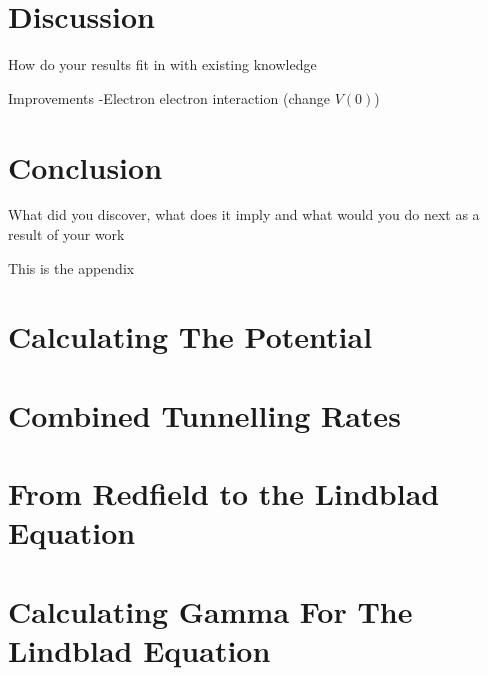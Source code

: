 \documentclass{article}
\begin{document}
\section{Discussion}
How do your results fit in with existing knowledge

Improvements
-Electron electron interaction (change \(V(0)\))


\section{Conclusion}
What did you discover, what does it imply and what would you do next as a result of your work

\printbibliography{}

\begin{appendix}
    This is the appendix
    \section{Calculating The Potential}\label{app:interaction potential calculation}
    

    \section{Combined Tunnelling Rates}\label{app:combined tunnelling rates}
    

    \section{From Redfield to the Lindblad Equation}
    

    \section{Calculating Gamma For The Lindblad Equation}
    


\end{appendix}
\end{document}
